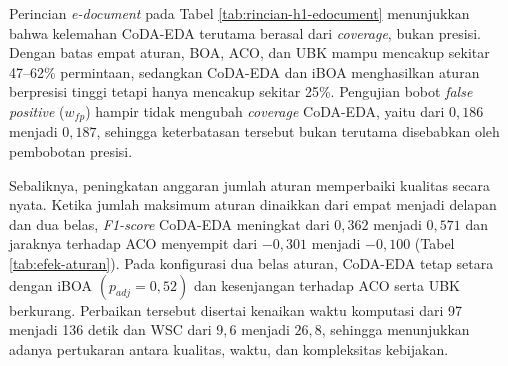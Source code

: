 Perincian \textit{e-document} pada Tabel \ref{tab:rincian-h1-edocument} menunjukkan bahwa kelemahan CoDA-EDA terutama berasal dari \textit{coverage}, bukan presisi. 
Dengan batas empat aturan, BOA, ACO, dan UBK mampu mencakup sekitar 47–62\% permintaan, sedangkan CoDA-EDA dan iBOA menghasilkan aturan berpresisi tinggi tetapi hanya mencakup sekitar 25\%. 
Pengujian bobot \textit{false positive} ($w_{fp}$) hampir tidak mengubah \textit{coverage} CoDA-EDA, yaitu dari $0,186$ menjadi $0,187$, sehingga keterbatasan tersebut bukan terutama disebabkan oleh pembobotan presisi.

Sebaliknya, peningkatan anggaran jumlah aturan memperbaiki kualitas secara nyata. 
Ketika jumlah maksimum aturan dinaikkan dari empat menjadi delapan dan dua belas, \textit{F1-score} CoDA-EDA meningkat dari $0,362$ menjadi $0,571$ dan jaraknya terhadap ACO menyempit dari ${-}0,301$ menjadi ${-}0,100$ (Tabel \ref{tab:efek-aturan}). 
Pada konfigurasi dua belas aturan, CoDA-EDA tetap setara dengan iBOA $(p_{adj}=0{,}52)$ dan kesenjangan terhadap ACO serta UBK berkurang. 
Perbaikan tersebut disertai kenaikan waktu komputasi dari 97 menjadi 136 detik dan WSC dari $9,6$ menjadi $26,8$, sehingga menunjukkan adanya pertukaran antara kualitas, waktu, dan kompleksitas kebijakan.


